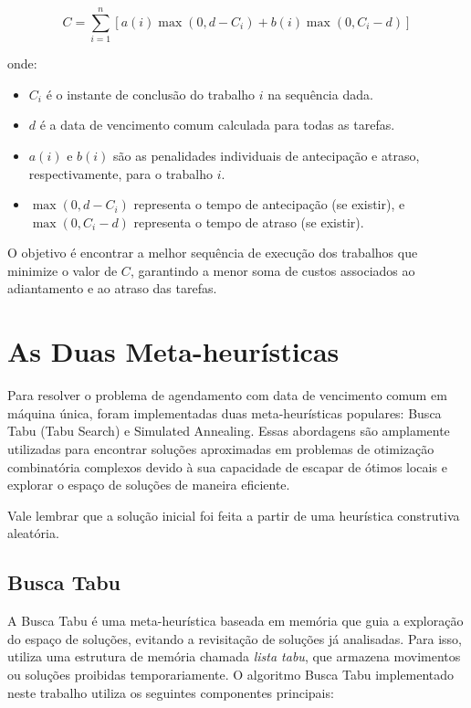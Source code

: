 \documentclass[12pt]{article}
\begin{document}
\[
C = \sum_{i=1}^{n} \left[ a(i) \max(0, d - C_i) + b(i) \max(0, C_i - d) \right]
\]

onde:  
\begin{itemize}
    \item $C_i$ é o instante de conclusão do trabalho $i$ na sequência dada.  
    \item $d$ é a data de vencimento comum calculada para todas as tarefas.  
    \item $a(i)$ e $b(i)$ são as penalidades individuais de antecipação e atraso, respectivamente, para o trabalho $i$.  
    \item $\max(0, d - C_i)$ representa o tempo de antecipação (se existir), e $\max(0, C_i - d)$ representa o tempo de atraso (se existir).
\end{itemize}

O objetivo é encontrar a melhor sequência de execução dos trabalhos que minimize o valor de $C$, garantindo a menor soma de custos associados ao adiantamento e ao atraso das tarefas.

\section{As Duas Meta-heurísticas} \label{sec:metaheuristicas}

Para resolver o problema de agendamento com data de vencimento comum em máquina única, foram implementadas duas meta-heurísticas populares: Busca Tabu (Tabu Search) e Simulated Annealing. Essas abordagens são amplamente utilizadas para encontrar soluções aproximadas em problemas de otimização combinatória complexos devido à sua capacidade de escapar de ótimos locais e explorar o espaço de soluções de maneira eficiente.

Vale lembrar que a solução inicial foi feita a partir de uma heurística construtiva aleatória.

\subsection{Busca Tabu}

A Busca Tabu é uma meta-heurística baseada em memória que guia a exploração do espaço de soluções, evitando a revisitação de soluções já analisadas. Para isso, utiliza uma estrutura de memória chamada \textit{lista tabu}, que armazena movimentos ou soluções proibidas temporariamente. O algoritmo Busca Tabu implementado neste trabalho utiliza os seguintes componentes principais:
\end{document}
